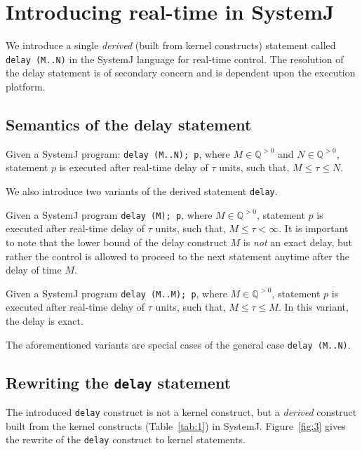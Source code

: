 \section{Introducing real-time in SystemJ}
\label{sec:intr-real-time}

We introduce a single \textit{derived} (built from kernel constructs)
statement called \mbox{\texttt{delay (M..N)}} in the SystemJ language
for real-time control. The resolution of the delay statement is of
secondary concern and is dependent upon the execution platform.

\subsection{Semantics of the delay statement}
\label{sec:semant-delay-stat}

Given a SystemJ program: \texttt{delay (M..N); p}, where $M \in
\mathbb{Q}^{>0}$ and $N \in \mathbb{Q}^{>0}$, statement $p$ is executed
after real-time delay of $\tau$ units, such that, $M \leq \tau \leq N$.

We also introduce two variants of the derived statement \texttt{delay}.
\begin{enumerate*}
\item Given a SystemJ program \texttt{delay (M); p}, where $M \in
  \mathbb{Q}^{>0}$, statement $p$ is executed after real-time delay of
  $\tau$ units, such that, $M \leq \tau < \infty$. It is important to
  note that the lower bound of the delay construct $M$ is \textit{not}
  an exact delay, but rather the control is allowed to proceed to the
  next statement anytime after the delay of time $M$.
\item Given a SystemJ program \texttt{delay (M..M); p}, where $M \in
  \mathbb{Q}^{>0}$, statement $p$ is executed after real-time delay of
  $\tau$ units, such that, $M \leq \tau \leq M$. In this variant, the
  delay is exact.
\end{enumerate*}

The aforementioned variants are special cases of the general case
\texttt{delay (M..N)}.

\subsection{Rewriting the \texttt{delay} statement}
\label{sec:rewr-delay-stat}

The introduced \texttt{delay} construct is not a kernel construct, but a
\textit{derived} construct built from the kernel constructs
(Table~\ref{tab:1}) in SystemJ. Figure~\ref{fig:3} gives the rewrite of
the \texttt{delay} construct to kernel statements.

